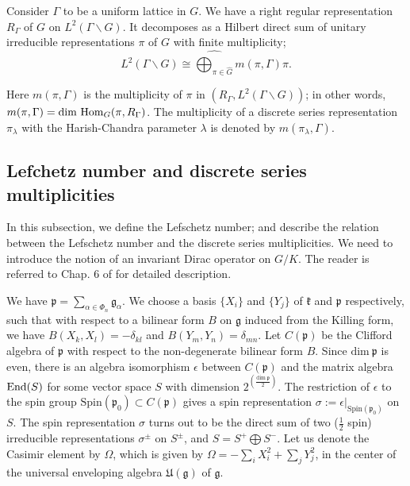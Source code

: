 \documentclass[11 pt]{amsart}
\newcommand{\Hom}{{\rm Hom}}
\newcommand{\End}{{\rm End}}
\theoremstyle{definition}
\numberwithin{equation}{section}
\begin{document}
Consider $\Gamma$ to be a uniform lattice in $G$. We have a right regular representation $R_{\Gamma}$ of $G$ on $L^2(\Gamma \backslash G)$. It decomposes as a Hilbert direct sum of unitary irreducible representations $\pi$ of $G$ with finite multiplicity; 
$$ L^2(\Gamma \backslash G) \cong \widehat{\bigoplus_{\pi \in \widehat{G}}} m(\pi, \Gamma) \pi. $$

\noindent Here $m(\pi, \Gamma)$ is the multiplicity of $\pi$ in $(R_\Gamma, L^2(\Gamma \backslash G))$; in other words, $m(\pi, \Gamma)=\text{dim}\ \Hom_G(\pi, R_{\Gamma}) $. The multiplicity of a discrete series representation $\pi_{\lambda}$ with the Harish-Chandra parameter $\lambda$ is denoted by $m(\pi_{\lambda} , \Gamma)$. 


\subsection{Lefchetz number and discrete series multiplicities}\label{sec-2-2}

In this subsection, we define the Lefschetz number; and describe the relation between the Lefschetz number and the discrete series multiplicities. We need to introduce the notion of an invariant Dirac operator on $G/K$. The reader is referred to Chap. 6 of \cite{FW} for detailed description.

\vspace{5pt}

\noindent  We have $\mathfrak{p}= \sum\limits_{\alpha \in \Phi_n} \mathfrak{g}_{\alpha}$. We choose a basis $\{X_i\}$ and $\{Y_j\}$ of $\mathfrak{k}$ and $\mathfrak{p}$ respectively, such that with respect to a bilinear form $B$ on $\mathfrak{g}$ induced from the Killing form, we have $B(X_k, X_l)= - \delta_{kl}$ and $B(Y_m, Y_n)= \delta_{mn}$. Let $C(\mathfrak{p})$ be the Clifford algebra of $\mathfrak{p}$ with respect to the non-degenerate bilinear form $B$. Since $\text{dim}\ \mathfrak{p}$ is even, there is an algebra isomorphism $\epsilon$ between $C(\mathfrak{p})$ and the matrix algebra $\End(S)$ for some vector space $S$ with dimension $2^{(\frac{\text{dim}\ \mathfrak{p}}{2})}$. The restriction of $\epsilon$ to the spin group $\text{Spin}(\mathfrak{p}_0) \subset C(\mathfrak{p})$ gives a spin representation $\sigma := \epsilon|_{\text{Spin}(\mathfrak{p}_0)}$ on $S$. The spin representation $\sigma$ turns out to be the direct sum of two ($\tfrac{1}{2}$ spin) irreducible representations $\sigma^{\pm}$ on $S^{\pm}$, and $S = S^+ \bigoplus S^-$. Let us denote the Casimir element by $\Omega$, which is given by $ \Omega = - \sum\limits_i X_i^2 + \sum\limits_j Y_j^2$, in the center of the universal enveloping algebra $\mathfrak{U(g)}$ of $\mathfrak{g}$. 
\end{document}
